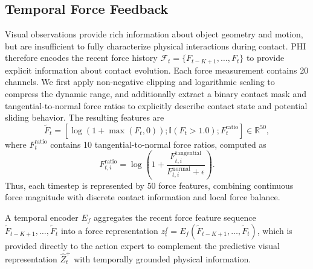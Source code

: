 \documentclass{article} %
\begin{document}
\subsection{Temporal Force Feedback}

Visual observations provide rich information about object geometry and
motion, but are insufficient to fully characterize physical interactions
during contact. PHI therefore encodes the recent force history
$\mathcal{F}_t=\{F_{t-K+1},\ldots,F_t\}$ to provide explicit information
about contact evolution. Each force measurement contains 20 channels. We
first apply non-negative clipping and logarithmic scaling to compress the
dynamic range, and additionally extract a binary contact mask and
tangential-to-normal force ratios to explicitly describe contact state and
potential sliding behavior. The resulting features are
\begin{equation}
    \widetilde{F}_t
    =
    \left[
        \log(1+\max(F_t,0));
        \mathbb{I}(F_t>1.0);
        F_t^{\mathrm{ratio}}
    \right]
    \in \mathbb{R}^{50},
\end{equation}
where $F_t^{\mathrm{ratio}}$ contains 10 tangential-to-normal force ratios,
computed as
\begin{equation}
    F_{t,i}^{\mathrm{ratio}}
    =
    \log\left(
        1+
        \frac{F_{t,i}^{\mathrm{tangential}}}
        {F_{t,i}^{\mathrm{normal}}+\epsilon}
    \right).
\end{equation}
Thus, each timestep is represented by $50$ force features,
combining continuous force magnitude with discrete contact information and
local force balance.

A temporal encoder $E_f$ aggregates the recent force feature sequence
$\widetilde{F}_{t-K+1},\ldots,\widetilde{F}_t$ into a force representation
$z_t^f=E_f(\widetilde{F}_{t-K+1},\ldots,\widetilde{F}_t)$, which is provided
directly to the action expert to complement the predictive visual
representation $\hat{Z}_t^{+}$ with temporally grounded physical information.




\end{document}
